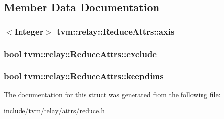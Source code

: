 \subsection{Member Data Documentation}
\subsubsection[{\texorpdfstring{axis}{axis}}]{$<${\bf Integer}$>$ tvm\+::relay\+::\+Reduce\+Attrs\+::axis}\hypertarget{structtvm_1_1relay_1_1ReduceAttrs_a175e6ed9d20ee26ae62f2f9e852bd858}{}\label{structtvm_1_1relay_1_1ReduceAttrs_a175e6ed9d20ee26ae62f2f9e852bd858}
\subsubsection[{\texorpdfstring{exclude}{exclude}}]{\setlength{\rightskip}{0pt plus 5cm}bool tvm\+::relay\+::\+Reduce\+Attrs\+::exclude}\hypertarget{structtvm_1_1relay_1_1ReduceAttrs_ada05c6d2e36245d832449aa2479d3ab2}{}\label{structtvm_1_1relay_1_1ReduceAttrs_ada05c6d2e36245d832449aa2479d3ab2}
\subsubsection[{\texorpdfstring{keepdims}{keepdims}}]{\setlength{\rightskip}{0pt plus 5cm}bool tvm\+::relay\+::\+Reduce\+Attrs\+::keepdims}\hypertarget{structtvm_1_1relay_1_1ReduceAttrs_afa8f7f2b60bcb5c44f6cd3338d80143a}{}\label{structtvm_1_1relay_1_1ReduceAttrs_afa8f7f2b60bcb5c44f6cd3338d80143a}


The documentation for this struct was generated from the following file\+:\begin{DoxyCompactItemize}
\item 
include/tvm/relay/attrs/\hyperlink{reduce_8h}{reduce.\+h}\end{DoxyCompactItemize}
